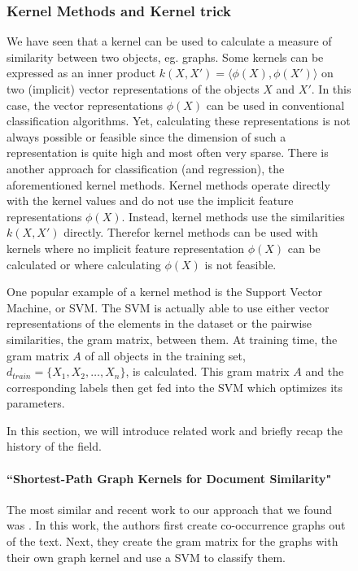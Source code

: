 \begin{figure}[ht]
\subsubsection{Kernel Methods and Kernel trick}
We have seen that a kernel can be used to calculate a measure of similarity between two objects, eg. graphs.
Some kernels can be expressed as an inner product $k(X, X') = \langle \phi(X), \phi(X') \rangle$ on two (implicit) vector representations of the objects $X$ and $X'$.
In this case, the vector representations $\phi(X)$ can be used in conventional classification algorithms.
Yet, calculating these representations is not always possible or feasible since the dimension of such a representation is quite high and most often very sparse.
There is another approach for classification (and regression), the aforementioned kernel methods.
Kernel methods operate directly with the kernel values and do not use the implicit feature representations $\phi(X)$.
Instead, kernel methods use the similarities $k(X, X')$ directly.
Therefor kernel methods can be used with kernels where no implicit feature representation $\phi(X)$ can be calculated or where calculating $\phi(X)$ is not feasible.

One popular example of a kernel method is the Support Vector Machine, or SVM.
The SVM is actually able to use either vector representations of the elements in the dataset or the pairwise similarities, the gram matrix, between them.
At training time, the gram matrix $A$ of all objects in the training set, $d_{train} = \{X_1, X_2, \ldots, X_n\}$, is calculated.
This gram matrix $A$ and the corresponding labels then get fed into the SVM which optimizes its parameters.


In this section, we will introduce related work and briefly recap the history of the field.


\paragraph{``Shortest-Path Graph Kernels for Document Similarity" \cite{Nikolentzos2017a}}
The most similar and recent work to our approach that we found was \cite{Nikolentzos2017a}. In this work, the authors first create co-occurrence graphs out of the text. Next, they create the gram matrix for the graphs with their own graph kernel and use a SVM to classify them.


\end{figure}
